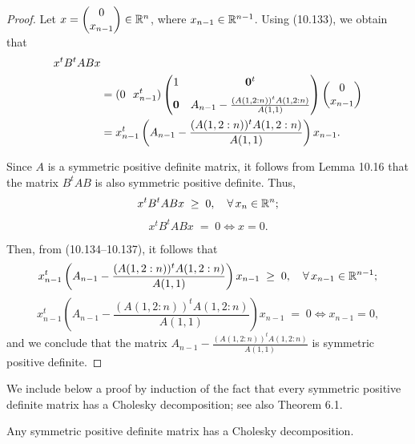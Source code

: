 \begin{proof}
Let $x = \begin{pmatrix} 0 \\ x_{n-1} \end{pmatrix} \in \mathbb{R}^n$, where $x_{n-1} \in
\mathbb{R}^{n-1}$. Using (10.133), we obtain that
\begin{align}
x^tB^tABx & \\
&= (0\ \ x_{n-1}^t) \begin{pmatrix} 1 & \mathbf{0}^t \\[0.6em]
\mathbf{0} & A_{n-1} - \frac{(A(1,2:n))^tA(1,2:n)}{A(1,1)} \end{pmatrix}
\begin{pmatrix} 0 \\ x_{n-1} \end{pmatrix} \notag \\
&= x_{n-1}^t\left(A_{n-1} - \frac{(A(1,2:n))^tA(1,2:n)}{A(1,1)}\right)x_{n-1}.
\end{align}

Since $A$ is a symmetric positive definite matrix, it follows from Lemma 10.16 that
the matrix $B^tAB$ is also symmetric positive definite. Thus,
\begin{equation}
x^tB^tABx \;\ge\; 0, \quad \forall\, x_n \in \mathbb{R}^n;
\end{equation}
\begin{equation}
x^tB^tABx \;=\; 0 \iff x = 0.
\end{equation}

Then, from (10.134--10.137), it follows that
\[
x_{n-1}^t\left(A_{n-1} - \frac{(A(1,2:n))^tA(1,2:n)}{A(1,1)}\right)x_{n-1} \;\ge\;
0, \quad \forall\, x_{n-1} \in \mathbb{R}^{n-1};
\]
\[
x_{n-1}^t\left(A_{n-1} - \frac{(A(1,2:n))^tA(1,2:n)}{A(1,1)}\right)x_{n-1} \;=\; 0
\iff x_{n-1} = 0,
\]
and we conclude that the matrix $A_{n-1} - \frac{(A(1,2:n))^tA(1,2:n)}{A(1,1)}$ is
symmetric positive definite.
\end{proof}

We include below a proof by induction of the fact that every symmetric positive
definite matrix has a Cholesky decomposition; see also Theorem 6.1.

\begin{theorem}
Any symmetric positive definite matrix has a Cholesky decomposition.
\end{theorem}

